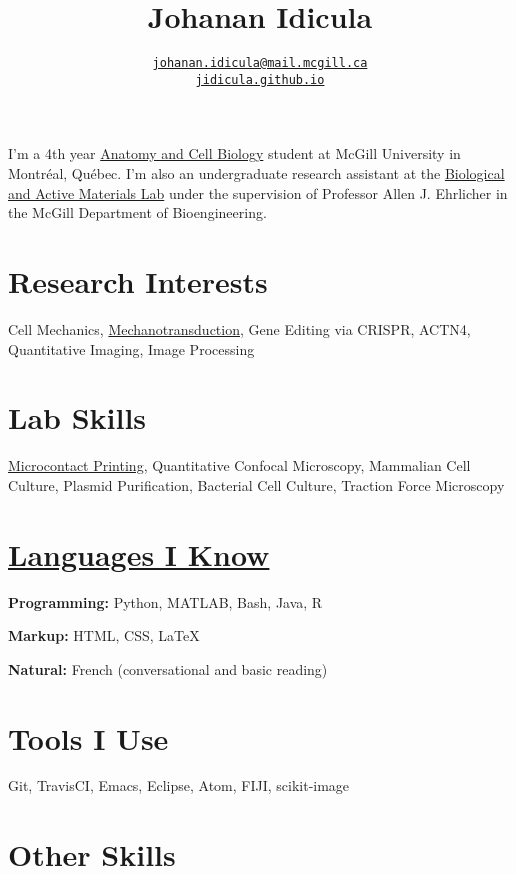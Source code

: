 \documentclass[%
	12pt,%
	]
	{article}
\title{\textbf{Johanan Idicula}}
\author{\href{mailto:johanan.idicula@mail.mcgill.ca}{\tt{johanan.idicula@mail.mcgill.ca}} \\ \href{https://jidicula.github.io/}{\tt{jidicula.github.io}}}
\date{} %
\begin{document}
\pagestyle{fancy}
\setlength\headheight{14pt}

\maketitle
\thispagestyle{fancy}

I'm a 4th year \href{http://www.mcgill.ca/anatomy}{Anatomy and Cell Biology} student at McGill University in Montr\'eal, Qu\'ebec. I'm also an undergraduate research assistant at the \href{http://bam.lab.mcgill.ca/}{Biological and Active Materials Lab} under the supervision of Professor Allen J. Ehrlicher in the McGill Department of Bioengineering.

\section*{Research Interests}

Cell Mechanics, \href{http://bam.lab.mcgill.ca/project_pages/ACTN4_Mechanosensitivity.html}{Mechanotransduction}, Gene Editing via CRISPR, ACTN4, Quantitative Imaging, Image Processing

\section*{Lab Skills}

\href{https://jidicula.github.io/images/micropattern.jpg}{Microcontact Printing}, Quantitative Confocal Microscopy, Mammalian Cell Culture, Plasmid Purification, Bacterial Cell Culture, Traction Force Microscopy


\section*{\href{https://github.com/jidicula}{Languages I Know}}

\textbf{Programming:} Python, MATLAB, Bash, Java, R

\textbf{Markup:} HTML, CSS, LaTeX

\textbf{Natural:} French (conversational and basic reading)

\section*{Tools I Use}

Git, TravisCI, Emacs, Eclipse, Atom, FIJI, scikit-image

\section*{Other Skills}
\end{document}
